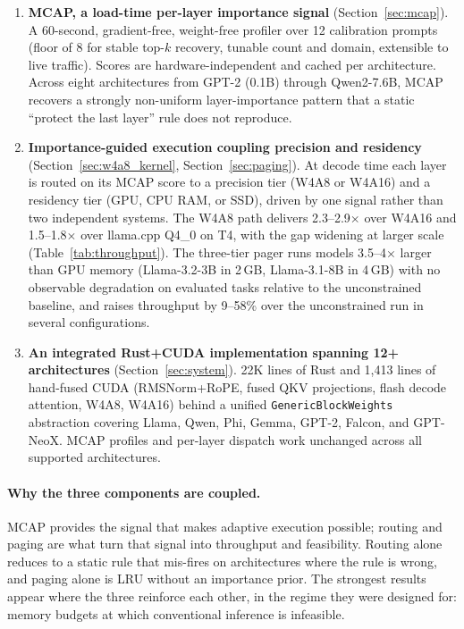 \documentclass{article}
\begin{document}
\begin{enumerate}[leftmargin=*, itemsep=2pt]
\item \textbf{MCAP, a load-time per-layer importance signal}
  (Section~\ref{sec:mcap}). A 60-second, gradient-free, weight-free
  profiler over 12 calibration prompts (floor of 8 for stable top-$k$
  recovery, tunable count and domain, extensible to live traffic).
  Scores are hardware-independent and cached per architecture. Across
  eight architectures from GPT-2 (0.1B) through Qwen2-7.6B, MCAP recovers
  a strongly non-uniform layer-importance pattern that a static ``protect
  the last layer'' rule does not reproduce.

\item \textbf{Importance-guided execution coupling precision and
  residency} (Section~\ref{sec:w4a8_kernel}, Section~\ref{sec:paging}).
  At decode time each layer is routed on its MCAP score to a precision
  tier (W4A8 or W4A16) and a residency tier (GPU, CPU RAM, or SSD),
  driven by one signal rather than two independent systems. The W4A8
  path delivers 2.3--2.9$\times$ over W4A16 and 1.5--1.8$\times$ over
  llama.cpp Q4\_0 on T4, with the gap widening at larger scale
  (Table~\ref{tab:throughput}). The three-tier pager runs models
  3.5--4$\times$ larger than GPU memory (Llama-3.2-3B in 2\,GB,
  Llama-3.1-8B in 4\,GB) with no observable degradation on evaluated
  tasks relative to the unconstrained baseline, and
  raises throughput by 9--58\% over the unconstrained run in several
  configurations.

\item \textbf{An integrated Rust+CUDA implementation spanning 12+
  architectures} (Section~\ref{sec:system}). 22K lines of Rust and
  1,413 lines of hand-fused CUDA (RMSNorm+RoPE, fused QKV projections,
  flash decode attention, W4A8, W4A16) behind a unified
  \texttt{GenericBlockWeights} abstraction covering Llama, Qwen, Phi,
  Gemma, GPT-2, Falcon, and GPT-NeoX. MCAP profiles and per-layer
  dispatch work unchanged across all supported architectures.
\end{enumerate}

\paragraph{Why the three components are coupled.} MCAP provides the signal
that makes adaptive execution possible; routing and paging are what turn
that signal into throughput and feasibility. Routing alone reduces to a
static rule that mis-fires on architectures where the rule is wrong, and
paging alone is LRU without an importance prior. The strongest results
appear where the three reinforce each other, in the regime they were
designed for: memory budgets at which conventional inference is infeasible.
\end{document}
